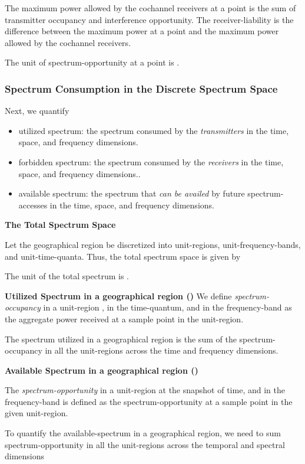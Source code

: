 \documentclass[journal,12pt,draftclsnofoot,onecolumn]{IEEEtran}
\begin{document}
The maximum power allowed by the cochannel receivers at a point is the sum of transmitter occupancy and interference opportunity. The receiver-liability is the difference between the maximum power at a point and the maximum power allowed by the cochannel receivers.

The unit of spectrum-opportunity at a point is .

\subsubsection{Spectrum Consumption in the Discrete Spectrum Space}
Next, we quantify 
\begin{itemize}
	\item utilized spectrum: the spectrum consumed by the \textit{transmitters} in the time, space, and frequency dimensions.
	\item forbidden spectrum: the spectrum consumed by the \textit{receivers} in the time, space, and frequency dimensions..
	\item available spectrum: the spectrum that \textit{can be availed} by future spectrum-accesses in the time, space, and frequency dimensions.
\end{itemize}

\noindent
\textbf{The Total Spectrum Space}

Let the geographical region be discretized into  unit-regions,  unit-frequency-bands, and  unit-time-quanta.  Thus, the total spectrum space is given by

The unit of the total spectrum is . 

\noindent
\textbf{Utilized Spectrum in a geographical region ()}
We define \textit{spectrum-occupancy} in a unit-region , in the  time-quantum, and in the frequency-band  as the aggregate power received at a sample point  in the unit-region. 

The spectrum utilized in a geographical region is the sum of the spectrum-occupancy in all the unit-regions across the time and frequency dimensions.


\noindent
\textbf{Available Spectrum in a geographical region ()}

The \textit{spectrum-opportunity} in a unit-region  at the  snapshot of time, and in the frequency-band  is defined as the spectrum-opportunity at a sample point  in the given unit-region. 

To quantify the available-spectrum in a geographical region, we need to sum spectrum-opportunity in all the unit-regions across the temporal and spectral dimensions
\end{document}
